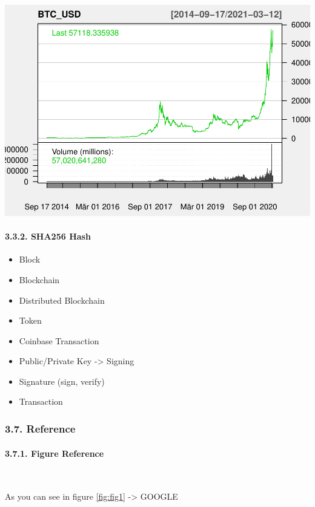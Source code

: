 \documentclass[
]{article}
\providecommand{\tightlist}{%
  \setlength{\itemsep}{0pt}\setlength{\parskip}{0pt}}
\begin{document}
\begin{center}\includegraphics[width=0.7\linewidth]{00_main_files/figure-latex/unnamed-chunk-10-1} \end{center}

\hypertarget{sha256-hash}{%
\paragraph{3.3.2. SHA256 Hash}\label{sha256-hash}}

\begin{itemize}
\tightlist
\item
  Block
\item
  Blockchain
\item
  Distributed Blockchain
\item
  Token
\item
  Coinbase Transaction
\item
  Public/Private Key -\textgreater{} Signing
\item
  Signature (sign, verify)
\item
  Transaction
\end{itemize}

\newpage

\hypertarget{reference}{%
\subsubsection{3.7. Reference}\label{reference}}

\hypertarget{figure-reference}{%
\paragraph{3.7.1. Figure Reference}\label{figure-reference}}

~

As you can see in figure \ref{fig:fig1} -\textgreater{} GOOGLE
\end{document}
